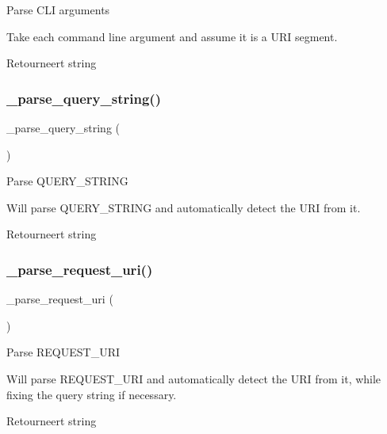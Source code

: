 Parse C\+LI arguments

Take each command line argument and assume it is a U\+RI segment.

\begin{DoxyReturn}{Retourneert}
string 
\end{DoxyReturn}
\mbox{\label{class_c_i___u_r_i_a2bb6abbe64a923ffef79a4a4c3da93db}} 
\subsubsection{\texorpdfstring{\_parse\_query\_string()}{\_parse\_query\_string()}}
{\footnotesize\ttfamily \+\_\+parse\+\_\+query\+\_\+string (\begin{DoxyParamCaption}{ }\end{DoxyParamCaption})\hspace{0.3cm}{\ttfamily [protected]}}

Parse Q\+U\+E\+R\+Y\+\_\+\+S\+T\+R\+I\+NG

Will parse Q\+U\+E\+R\+Y\+\_\+\+S\+T\+R\+I\+NG and automatically detect the U\+RI from it.

\begin{DoxyReturn}{Retourneert}
string 
\end{DoxyReturn}
\mbox{\label{class_c_i___u_r_i_ae2e75a6f6657df51c7b6de926979af29}} 
\subsubsection{\texorpdfstring{\_parse\_request\_uri()}{\_parse\_request\_uri()}}
{\footnotesize\ttfamily \+\_\+parse\+\_\+request\+\_\+uri (\begin{DoxyParamCaption}{ }\end{DoxyParamCaption})\hspace{0.3cm}{\ttfamily [protected]}}

Parse R\+E\+Q\+U\+E\+S\+T\+\_\+\+U\+RI

Will parse R\+E\+Q\+U\+E\+S\+T\+\_\+\+U\+RI and automatically detect the U\+RI from it, while fixing the query string if necessary.

\begin{DoxyReturn}{Retourneert}
string 
\end{DoxyReturn}
\mbox{\label{class_c_i___u_r_i_a01fdc82a66a1611d3e5d42461c1ad59c}} 
